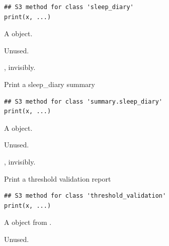 \documentclass[a4paper]{book}
\begin{document}
%
\begin{Usage}
\begin{verbatim}
## S3 method for class 'sleep_diary'
print(x, ...)
\end{verbatim}
\end{Usage}
%
\begin{Arguments}
\begin{ldescription}
\item[\code{x}] A  object.

\item[\code{...}] Unused.
\end{ldescription}
\end{Arguments}
%
\begin{Value}
, invisibly.
\end{Value}
%
\begin{Description}
Print a sleep\_diary summary
\end{Description}
%
\begin{Usage}
\begin{verbatim}
## S3 method for class 'summary.sleep_diary'
print(x, ...)
\end{verbatim}
\end{Usage}
%
\begin{Arguments}
\begin{ldescription}
\item[\code{x}] A  object.

\item[\code{...}] Unused.
\end{ldescription}
\end{Arguments}
%
\begin{Value}
, invisibly.
\end{Value}
%
\begin{Description}
Print a threshold validation report
\end{Description}
%
\begin{Usage}
\begin{verbatim}
## S3 method for class 'threshold_validation'
print(x, ...)
\end{verbatim}
\end{Usage}
%
\begin{Arguments}
\begin{ldescription}
\item[\code{x}] A  object from .

\item[\code{...}] Unused.
\end{ldescription}
\end{Arguments}
\end{document}

